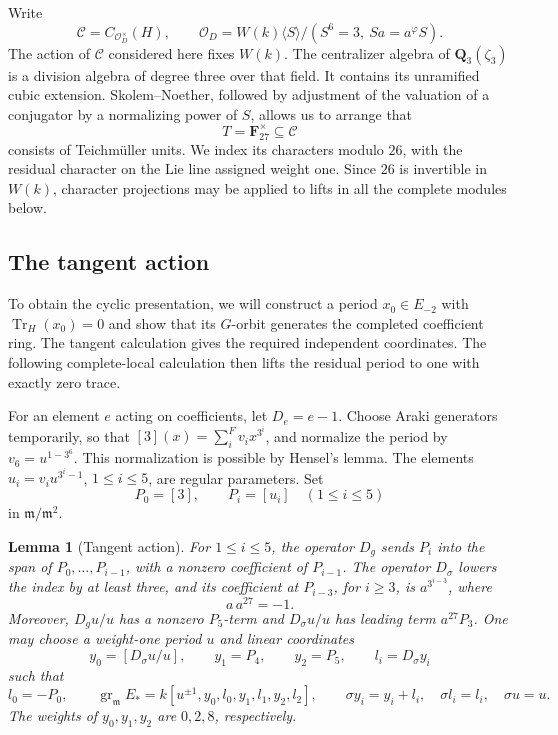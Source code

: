 \documentclass[11pt]{article}
\newtheorem{lemma}[theorem]{Lemma}
\theoremstyle{definition}
\theoremstyle{remark}
\numberwithin{equation}{section}
\begin{document}
Write
\[
 \mathcal C=C_{\mathcal O_D^\times}(H),\qquad
 \mathcal O_D=W(k)\langle S\rangle/(S^6=3,\ Sa=a^\varphi S).
\]
The action of \(\mathcal C\) considered here fixes \(W(k)\).  The
centralizer algebra of \(\mathbf Q_3(\zeta_3)\) is a division algebra of degree
three over that field.  It contains its unramified cubic extension.
Skolem--Noether, followed by adjustment of the valuation of a conjugator
by a normalizing power of \(S\), allows us to arrange that
\[
 T=\mathbf F_{27}^{\times}\subseteq\mathcal C
\]
consists of Teichm\"uller units.  We index its characters modulo \(26\),
with the residual character on the Lie line assigned weight one.
Since \(26\) is invertible in \(W(k)\), character projections may be
applied to lifts in all the complete modules below.

\subsection{The tangent action}

To obtain the cyclic presentation, we will construct a period
\(x_0\in E_{-2}\) with \(\operatorname{Tr}_H(x_0)=0\) and show that its
\(G\)-orbit generates the completed coefficient ring.  The tangent
calculation gives the required independent coordinates.  The following
complete-local calculation then lifts the residual period to one with
exactly zero trace.

For an element \(e\) acting on coefficients, let \(D_e=e-1\).  Choose
Araki generators temporarily, so that
\([3](x)=\sum_i^F v_i x^{3^i}\), and normalize the period by
\(v_6=u^{1-3^6}\).  This normalization is possible by Hensel's lemma.
The elements \(u_i=v_i u^{3^i-1}\), \(1\le i\le5\), are regular
parameters.  Set
\[
 P_0=[3],\qquad P_i=[u_i]\quad(1\le i\le5)
\]
in \(\mathfrak m/\mathfrak m^2\).

\begin{lemma}[Tangent action]\label{coef:tangent}
For \(1\le i\le5\), the operator \(D_g\) sends \(P_i\) into the span of
\(P_0,\ldots,P_{i-1}\), with a nonzero coefficient of \(P_{i-1}\).
The operator \(D_\sigma\) lowers the index by at least three, and its
coefficient at \(P_{i-3}\), for \(i\ge3\), is
\(a^{3^{i-3}}\), where
\[
 a\,a^{27}=-1.
\]
Moreover, \(D_g u/u\) has a nonzero \(P_5\)-term and
\(D_\sigma u/u\) has leading term \(a^{27}P_3\).
One may choose a weight-one period \(u\) and linear coordinates
\[
 y_0=[D_\sigma u/u],\qquad y_1=P_4,\qquad y_2=P_5,\qquad
 l_i=D_\sigma y_i
\]
such that
\[
 l_0=-P_0,\qquad
 \operatorname{gr}_{\mathfrak m}E_*
   =k[u^{\pm1},y_0,l_0,y_1,l_1,y_2,l_2],
 \qquad
 \sigma y_i=y_i+l_i,\quad \sigma l_i=l_i,\quad \sigma u=u.
\]
The weights of \(y_0,y_1,y_2\) are \(0,2,8\), respectively.
\end{lemma}
\end{document}
